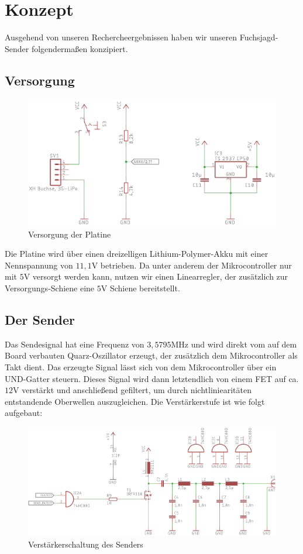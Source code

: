 \section{Konzept}
Ausgehend von unseren Rechercheergebnissen haben wir unseren Fuchsjagd-Sender
folgendermaßen konzipiert.
\subsection{Versorgung}
\begin{figure}[H]
\centering
\includegraphics{res/Versorgung.png}
\caption{Versorgung der Platine}
\end{figure}
Die Platine wird über einen dreizelligen Lithium-Polymer-Akku mit einer Nennspannung
von $11,1$V betrieben. Da unter anderem der Mikrocontroller nur mit $5$V versorgt
werden kann, nutzen wir einen Linearregler, der zusätzlich zur Versorgungs-Schiene eine
$5$V Schiene bereitstellt.

\subsection{Der Sender}
Das Sendesignal hat eine Frequenz von $3,5795$MHz und wird direkt vom auf dem Board
verbauten Quarz-Oszillator erzeugt, der zusätzlich dem Mikrocontroller als Takt
dient. Das erzeugte Signal lässt sich von dem Mikrocontroller über ein UND-Gatter steuern. Dieses
Signal wird dann letztendlich von einem FET auf ca. $12$V verstärkt und anschließend gefiltert,
um durch nichtliniearitäten entstandende Oberwellen auszugleichen. Die Verstärkerstufe ist wie folgt aufgebaut:

\begin{figure}[H]
\includegraphics{res/Endstufe.png}
\caption{Verstärkerschaltung des Senders}
\end{figure}

